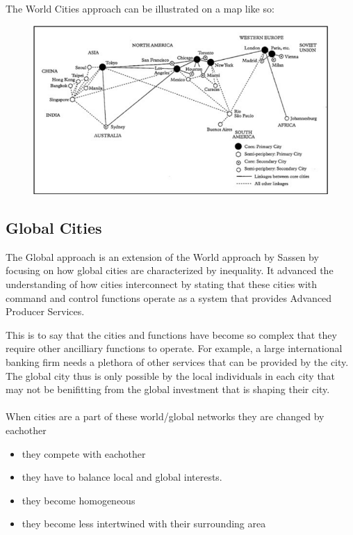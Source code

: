 \documentclass[12pt]{book}
\begin{document}
The World Cities approach can be illustrated on a map like so:
\begin{figure}[h]
        \centering
        \includegraphics[scale=0.5]{./figures/wcitymap.png}
\end{figure}

\subsection*{Global Cities}
The Global approach is an extension of the World approach by Sassen by focusing on how global cities are characterized by inequality. 
It advanced the understanding of how cities interconnect by stating that these cities with command and control functions operate as 
        a system that provides Advanced Producer Services.

This is to say that the cities and functions have become so complex that they require other ancilliary functions to operate.
For example, a large international banking firm needs a plethora of other services that can be provided by the city.
The global city thus is only possible by the local individuals in each city that may not be benifitting from the global investment
        that is shaping their city.
\pagebreak

\paragraph{}
When cities are a part of these world/global networks they are changed by eachother
\begin{itemize}
        \item they compete with eachother
        \item they have to balance local and global interests.
        \item they become homogeneous 
        \item they become less intertwined with their surrounding area
\end{itemize}
\end{document}
